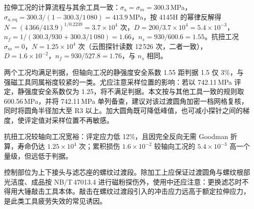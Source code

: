 拉伸工况的计算流程与其余工具一致：$\sigma_a=\sigma_m=300.3$\,MPa，$\sigma_{a,\mathrm{eq}}=300.3/(1-300.3/1\,080)=413.9$\,MPa，按 4145H 的幂律反解得 $N=(4\,366/413.9)^{1/0.2239}=3.7\times10^{4}$ 次，$D=200/3.7\times10^{4}=5.4\times10^{-3}$，$n_f=1/(300.3/930+300.3/1\,080)=1.66$，$n_s=930/600.6=1.55$。抗扭工况 $\sigma_m=0$，$N=1.25\times10^{4}$ 次（云图探针读数 12\,526 次，二者一致），$D=1.6\times10^{-2}$，$n_f=930/527.8=1.76$，与 $n_s$ 相同。

两个工况均满足判据，但轴向工况的静强度安全系数 1.55 距判据 1.5 仅 3\%，与强磁工具同属裕度较紧的一类。尤应注意采样位置的影响：若以 742.11\,MPa 评定，静强度安全系数仅为 1.25，将不满足判据。本文按与其他工具一致的规则取 600.56\,MPa，并将 742.11\,MPa 单列备查，建议对该过渡圆角加密一档网格复核，同时将圆角半径加大至 R3 以上。加大圆角既可降低峰值，也可减小探针之间的梯度，使评定值对采样位置不再敏感。

抗扭工况较轴向工况宽裕：评定应力低 12\%，且因完全反向无需 Goodman 折算，寿命仍达 $1.25\times10^{4}$ 次；累积损伤 $1.6\times10^{-2}$ 较轴向工况的 $5.4\times10^{-3}$ 高一个量级，但远低于判据。

控制部位为上下接头与滤芯座的螺纹过渡段。除加工上应保证过渡圆角与螺纹根部光洁度、成品按 NB/T\,47013.4 进行磁粉探伤外，使用中还应注意：更换滤芯时不得用大锤敲击工具本体。敲击在螺纹过渡段引入的冲击应力远高于额定拉伸应力，是此类工具疲劳失效的常见诱因。
